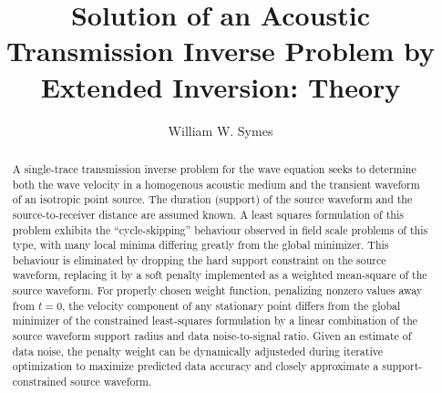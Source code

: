 \title{Solution of an Acoustic Transmission Inverse Problem by
  Extended Inversion: Theory}
\author{William W. Symes\footnotemark[1]}
\address{\footnotemark[1]PO Box 43, Orcas, WA 98280 USA, {\tt symes@rice.edu}}



\maketitle
\begin{abstract}
  A single-trace transmission inverse problem for the wave equation
  seeks to determine both the wave velocity in a homogenous acoustic
  medium and the transient waveform of an isotropic point source. The
  duration (support) of the source waveform and the source-to-receiver
  distance are assumed known. A least squares formulation of this
  problem exhibits the ``cycle-skipping'' behaviour observed in field
  scale problems of this type, with many local minima differing
  greatly from the global minimizer. This behaviour is eliminated by
  dropping the hard support constraint on the source waveform,
  replacing it by a soft penalty implemented as a weighted mean-square
  of the source waveform. For properly chosen weight function,
  penalizing nonzero values away from $t=0$, the velocity component of
  any stationary point differs from the global minimizer of the
  constrained least-squares formulation by a linear combination of the
  source waveform support radius and data noise-to-signal ratio. Given
  an estimate of data noise, the penalty weight can be dynamically
  adjusteded during iterative optimization to maximize predicted data
  accuracy and closely approximate a support-constrained source waveform.

\end{abstract}


